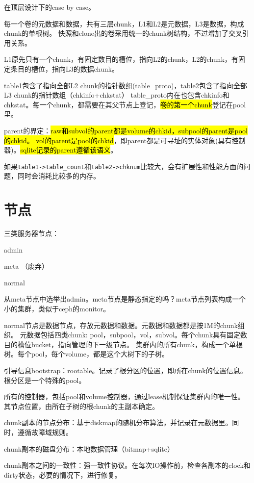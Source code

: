 在顶层设计下的case by case。

每一个卷的元数据和数据，共有三层chunk，L1和L2是元数据，L3是数据，构成chunk的单根树。
快照和clone出的卷采用统一的chunk树结构，不过增加了交叉引用关系。

L1原先只有一个chunk，有固定数目的槽位，指向L2的chunk，L2的chunk，有固定条目的槽位，指向L3的数据chunk。

table1包含了指向全部L2 chunk的指针数组(table\_proto)，table2包含了指向全部L3 chunk的指针数组（chkinfo+chkstat）
table\_proto内在也包含chkinfo和chkstat。每一个chunk，都需要在其父节点上登记，\hl{卷的第一个chunk}登记在pool里。

parent的界定：\hl{raw和subvol的parent都是volume的chkid，subpool的parent是pool的chkid。
vol的parent是pool的chkid}，即parent都是可寻址的实体对象(具有控制器)。\hl{sqlite记录的parent遵循该语义}。

如果\verb|table1->table_count|和\verb|table2->chknum|比较大，会有扩展性和性能方面的问题，同时会消耗比较多的内存。

\section{节点}

三类服务器节点：
\begin{compactenum}
\item admin
\item meta （废弃）
\item normal
\end{compactenum}

从meta节点中选举出admin。meta节点是静态指定的吗？meta节点列表构成一个小的集群，类似于ceph的monitor。

normal节点是数据节点，存放元数据和数据。元数据和数据都是按1M的chunk组织。
元数据包括四类chunk: pool，subpool，vol，subvol。每个chunk具有固定数目的槽位bucket，指向管理的下一级节点。
集群内的所有chunk，构成一个单根树。每个pool，每个volume，都是这个大树下的子树。

引导信息bootstrap：rootable。记录了根分区的位置，即所在chunk的位置信息。根分区是一个特殊的pool。

所有的控制器，包括pool和volume控制器，通过lease机制保证集群内的唯一性。
其节点位置，由所在子树的根chunk的主副本确定。

chunk副本的节点分布：基于diskmap的随机分布算法，并记录在元数据里。同时，遵循故障域规则。

chunk副本的磁盘分布：本地数据管理（bitmap+sqlite）

chunk副本之间的一致性：强一致性协议。在每次IO操作前，检查各副本的clock和dirty状态，必要的情况下，进行修复。

